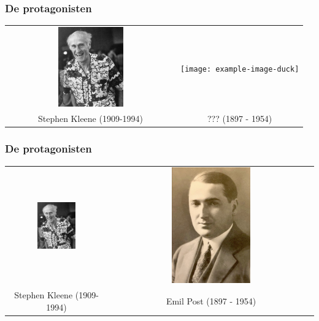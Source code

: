 \documentclass[handout]{beamer}
\begin{document}
\begin{frame}
    \frametitle{De protagonisten}
    \begin{tabular*}{\textwidth}{c c}
        \includegraphics[width=0.4\textwidth]{Kleene.jpeg} & \texttt{[image: example-image-duck]} \\
        {\large Stephen Kleene} (1909-1994) & {\large ???} (1897 - 1954)\\
    \end{tabular*}
\end{frame}

\begin{frame}
    \frametitle{De protagonisten}
    \begin{tabular*}{\textwidth}{c c}
        \includegraphics[width=0.4\textwidth]{Kleene.jpeg} & \includegraphics[width=0.4\textwidth]{Post.jpg} \\
        {\large Stephen Kleene} (1909-1994) & {\large Emil Post} (1897 - 1954)\\
    \end{tabular*}
\end{frame}
\end{document}
